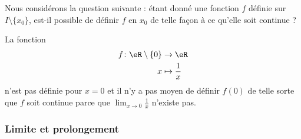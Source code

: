 Nous considérons la question suivante : étant donné une fonction \( f\) définie sur \( I\setminus\{ x_0 \}\), est-il possible de définir \( f\) en \( x_0\) de telle façon à ce qu'elle soit continue ?

\begin{example}
	La fonction
	\begin{equation}
		\begin{aligned}
			f\colon \eR\setminus\{ 0 \} & \to \eR               \\
			x                           & \mapsto \frac{1}{ x }
		\end{aligned}
	\end{equation}
	n'est pas définie pour \( x=0\) et il n'y a pas moyen de définir \( f(0)\) de telle sorte que \( f\) soit continue parce que \( \lim_{x\to 0} \frac{1}{ x }\) n'existe pas.
\end{example}

\subsubsection{Limite et prolongement}

